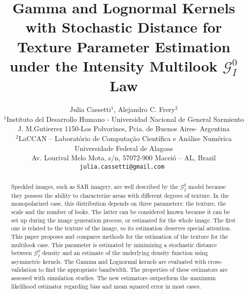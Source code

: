 \documentclass[a4paper]{article} %
\date{} %
\begin{document}
\thispagestyle{empty}

\title{\textbf{Gamma and Lognormal Kernels with Stochastic Distance for Texture Parameter Estimation under the Intensity Multilook $\mathcal G_I^0$ Law}}
\author{Julia Cassetti{\small $^1$}, Alejandro C. Frery{\small $^2$}\\ %
	{\small $^1$Instituto del Desarrollo Humano -  Universidad Nacional de General Sarmiento} \\
	{\small J. M.Gutierrez 1150-Los Polvorines, Pcia. de Buenos Aires- Argentina}\\\small 
	$^2$LaCCAN -- Laborat\'orio de Computa\c c\~ao Cient\'ifica e An\'alise Num\'erica\\
	\small Universidade Federal de Alagoas\\
	\small Av. Lourival Melo Mota, s/n, 57072-900 Macei\'o -- AL, Brazil\\
	\tt{julia.cassetti@gmail.com} %
}%

\date{} %
\maketitle\thispagestyle{empty} %


\begin{abstract}
Speckled images, such as SAR imagery, are well described by the $\mathcal G_I^0$ model because they possess the ability to characterize areas with different degrees of texture. 
In the monopolarized case, this distribution depends on three parameters: the texture, the scale and the number of looks.
The latter can be considered known because it can be set up during the image generation process, or estimated for the whole image. The first one is related to the texture of the image, so its estimation deserves special attention.
This paper proposes and compares methods for the estimation of the texture for the multilook case. 
This parameter is estimated by minimizing a stochastic distance between $\mathcal G_I^0$ density and an estimate of the underlying density function using asymmetric kernels.
The Gamma and Lognormal kernels are evaluated with cross-validation to find the appropriate bandwidth.
The properties of these estimators are assessed with simulation studies. 
The new estimators outperform the maximum likelihood estimator regarding bias and mean squared error in most cases.
\end{abstract}
\end{document}
